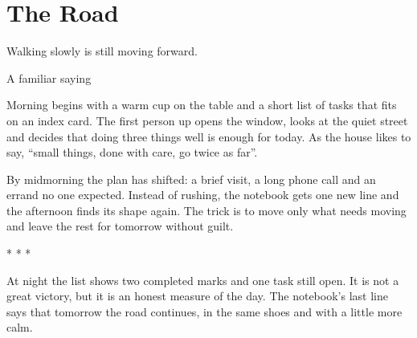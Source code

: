 \chapter{The Road}

\epigraph{Walking slowly is still moving forward.}{A familiar saying}

Morning begins with a warm cup on the table and a short list of tasks that
fits on an index card. The first person up opens the window, looks at the
quiet street and decides that doing three things well is enough for today.
As the house likes to say, \enquote{small things, done with care, go twice as far}.

By midmorning the plan has shifted: a brief visit, a long phone call and an
errand no one expected. Instead of rushing, the notebook gets one new line
and the afternoon finds its shape again. The trick is to move only what
needs moving and leave the rest for tomorrow without guilt.

\begin{center}
  * * *
\end{center}

At night the list shows two completed marks and one task still open. It is
not a great victory, but it is an honest measure of the day. The notebook's
last line says that tomorrow the road continues, in the same shoes and with
a little more calm.
